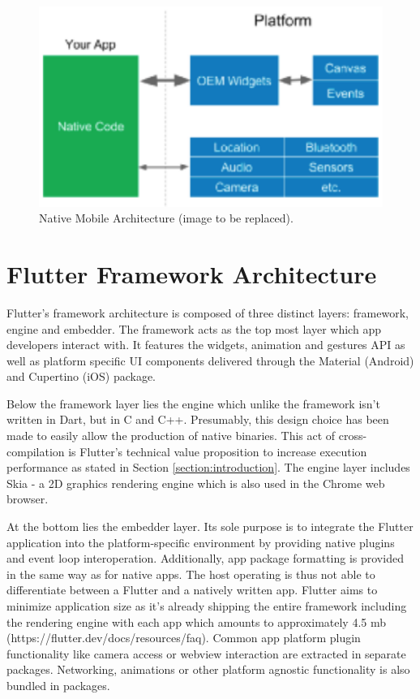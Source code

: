 \begin{figure}
    \includegraphics[width=\linewidth]{images/architectures/native_architecture.eps}
    \caption{Native Mobile Architecture (image to be replaced).}
    \label{fig:native_architecture}
\end{figure}

\section{Flutter Framework Architecture} \label{section::flutter_architecture}
Flutter's framework architecture is composed of three distinct layers: framework, engine and embedder. The framework acts as the top most layer which 
app developers interact with. It features the widgets, animation and gestures API as well as platform specific UI components delivered through
the Material (Android) and Cupertino (iOS) package.

Below the framework layer lies the engine which unlike the framework isn't written in Dart, but in C and C++. Presumably, this design choice has been 
made to easily allow the production of native binaries. This act of cross-compilation is Flutter's technical value proposition to increase execution performance as stated in 
Section \ref{section:introduction}. The engine layer includes Skia - a 2D graphics rendering engine which is also used in the Chrome web browser.

At the bottom lies the embedder layer. Its sole purpose is to integrate the Flutter application into the platform-specific environment
by providing native plugins and event loop interoperation. 
Additionally, app package formatting is provided in the same way as for native apps. 
The host operating is thus not able to differentiate between a Flutter and a natively written app.
Flutter aims to minimize application size as it's already shipping the entire framework including the rendering engine with each app which amounts
to approximately 4.5 mb (https://flutter.dev/docs/resources/faq). Common app platform plugin functionality like camera access or webview 
interaction are extracted in separate packages. Networking, animations or other platform agnostic functionality is also bundled in packages. 

